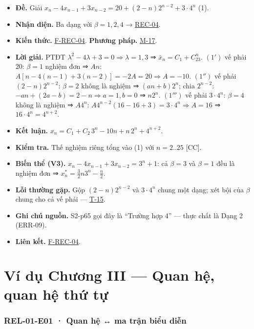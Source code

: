 \documentclass[
  10pt,
  twoside,openany]{book}
\providecommand{\tightlist}{%
  \setlength{\itemsep}{0pt}\setlength{\parskip}{0pt}}
\begin{document}
\begin{itemize}
\tightlist
\item
  \textbf{Đề.} Giải \(x_n-4x_{n-1}+3x_{n-2}=20+(2-n)2^{n-2}+3\cdot4^n\)
  (1).
\item
  \textbf{Nhận diện.} Ba dạng với \(\beta=1,2,4\) →
  \protect\hyperlink{REC-04}{REC-04}.
\item
  \textbf{Kiến thức.} \protect\hyperlink{F-REC-04}{F-REC-04}.
  \textbf{Phương pháp.} \protect\hyperlink{M-17}{M-17}.
\item
  \textbf{Lời giải.} PTĐT
  \(\lambda^2-4\lambda+3=0\Rightarrow\lambda=1,3\) ⇒
  \(\bar x_n=C_1+C_23^n\). \((1')\) vế phải 20: \(\beta=1\) nghiệm đơn ⇒
  \(An\): \(A[n-4(n-1)+3(n-2)]=-2A=20\Rightarrow A=-10\). \((1'')\) vế
  phải \((2-n)2^{n-2}\): \(\beta=2\) không là nghiệm ⇒ \((an+b)2^n\);
  chia \(2^{n-2}\): \(-an+(2a-b)=2-n\Rightarrow a=1,b=0\) ⇒ \(n2^n\).
  \((1''')\) vế phải \(3\cdot4^n\): \(\beta=4\) không là nghiệm ⇒
  \(A4^n\): \(A4^{n-2}(16-16+3)=3\cdot4^n\Rightarrow A=16\) ⇒
  \(16\cdot4^n=4^{n+2}\).
\item
  \textbf{Kết luận.} \(x_n=C_1+C_2\,3^n-10n+n\,2^n+4^{n+2}\).
\item
  \textbf{Kiểm tra.} Thế nghiệm riêng tổng vào (1) với \(n=2..25\)
  {[}CC{]}.
\item
  \textbf{Biến thể (V3).} \(x_n-4x_{n-1}+3x_{n-2}=3^n+1\): cả
  \(\beta=3\) và \(\beta=1\) đều là nghiệm đơn ⇒
  \(x_n^*=\frac32n3^n-\frac n2\).
\item
  \textbf{Lỗi thường gặp.} Gộp \((2-n)2^{n-2}\) và \(3\cdot4^n\) chung
  một dạng; xét bội của \(\beta\) chung cho cả vế phải ---
  \protect\hyperlink{T-15}{T-15}.
\item
  \textbf{Ghi chú nguồn.} S2-p65 gọi đây là ``Trường hợp 4'' --- thực
  chất là Dạng 2 (ERR-09).
\item
  \textbf{Liên kết.} \protect\hyperlink{F-REC-04}{F-REC-04}.
\end{itemize}

\hypertarget{ex-ch3}{%
\chapter{Ví dụ Chương III --- Quan hệ, quan hệ thứ tự}\label{ex-ch3}}

\hypertarget{REL-01-E01}{%
\subsection{REL-01-E01 · Quan hệ ↔ ma trận biểu diễn}\label{REL-01-E01}}
\end{document}
